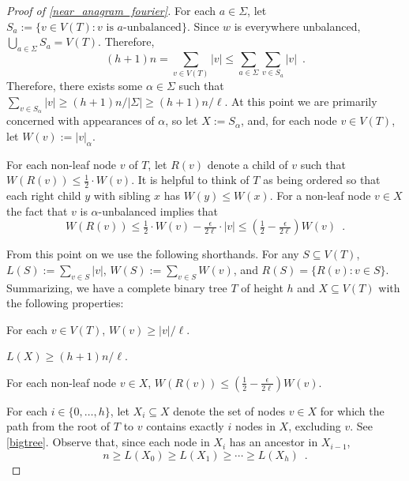 \documentclass{patmorin}
\begin{document}
\begin{proof}[Proof of \cref{near_anagram_fourier}]
  For each $a\in\Sigma$, let $S_a:=\{v\in V(T): \text{$v$ is $a$-unbalanced}\}$. Since $w$ is everywhere unbalanced, $\bigcup_{a\in\Sigma} S_a=V(T)$. Therefore,
  \[
     (h+1)n = \sum_{v\in V(T)}|v|\le \sum_{a\in\Sigma} \sum_{v\in S_a} |v|
     \enspace .
  \]
  Therefore, there exists some $\alpha\in\Sigma$ such that $\sum_{v\in S_{\alpha}}|v|\ge (h+1)n/|\Sigma| \ge (h+1)n/\ell$.   At this point we are primarily concerned with appearances of $\alpha$, so let $X:=S_{\alpha}$, and, for each node $v\in V(T)$, let $W(v):=|v|_\alpha$.

  For each non-leaf node $v$ of $T$, let $R(v)$ denote a child of $v$ such that $W(R(v))\le \tfrac12\cdot W(v)$.  It is helpful to think of $T$ as being ordered so that each right child $y$ with sibling $x$ has $W(y)\le W(x)$. For a non-leaf node $v\in X$ the fact that $v$ is $\alpha$-unbalanced implies that
  \[  W(R(v)) \le \tfrac{1}{2}\cdot W(v) - \tfrac{\epsilon}{2\ell}\cdot |v|
      \le (\tfrac12-\tfrac{\epsilon}{2\ell})W(v) \enspace .
  \]

  From this point on we use the following shorthands. For any $S\subseteq V(T)$, $L(S):=\sum_{v\in S}|v|$,
  $W(S):=\sum_{v\in S}W(v)$, and $R(S)=\{R(v):v\in S\}$.  Summarizing, we have a complete binary tree $T$ of height $h$ and
  $X\subseteq V(T)$ with the following properties:
  \begin{compactenum}
    \item For each $v\in V(T)$,  $W(v)\ge |v|/\ell$.
    \item $L(X) \ge (h+1)n/\ell$.
    \item For each non-leaf node $v\in X$,
      $W(R(v)) \le (\tfrac{1}{2}-\tfrac{\epsilon}{2\ell})W(v)$.
  \end{compactenum}
  For each $i\in\{0,\ldots,h\}$, let $X_i\subseteq X$ denote the
  set of nodes $v\in X$ for which the path from the root of $T$ to $v$
  contains exactly $i$ nodes in $X$, excluding $v$.  See \cref{bigtree}. Observe that, since each node in $X_i$ has an ancestor in $X_{i-1}$,
  \[  n \ge L(X_0) \ge L(X_1) \ge \cdots\ge L(X_{h}) \enspace . \]


\end{proof}
\end{document}
